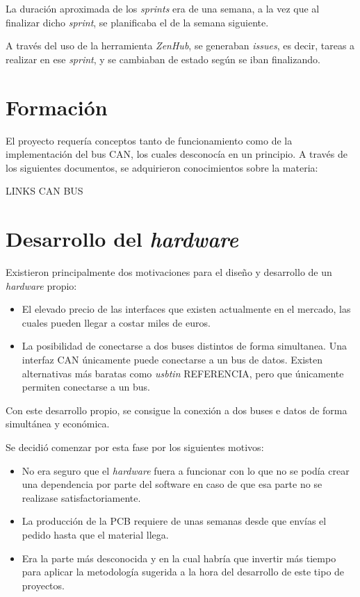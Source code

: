 La duración aproximada de los \emph{sprints} era de una semana, a la vez que al finalizar dicho \emph{sprint}, se planificaba el de la semana siguiente.

A través del uso de la herramienta \emph{ZenHub}, se generaban \emph{issues}, es decir, tareas a realizar en ese \emph{sprint}, y se cambiaban de estado según se iban finalizando.

\section{Formación}\label{formacion}

El proyecto requería conceptos tanto de funcionamiento como de la implementación del bus CAN, los cuales desconocía en un principio. A través de los siguientes documentos, se adquirieron conocimientos sobre la materia:


LINKS CAN BUS


\section{Desarrollo del \emph{hardware}}\label{desarrollo_del_hardware}

Existieron principalmente dos motivaciones para el diseño y desarrollo de un \emph{hardware} propio:

\begin{itemize}
\item
El elevado precio de las interfaces que existen actualmente en el mercado, las cuales pueden llegar a costar miles de euros.
\item
La posibilidad de conectarse a dos buses distintos de forma simultanea. Una interfaz CAN únicamente puede conectarse a un bus de datos. Existen alternativas más baratas como \emph{usbtin} REFERENCIA, pero que únicamente permiten conectarse a un bus.
\end{itemize}

Con este desarrollo propio, se consigue la conexión a dos buses e datos de forma simultánea y económica.

Se decidió comenzar por esta fase por los siguientes motivos:

\begin{itemize}
\item
No era seguro que el \emph{hardware} fuera a funcionar con lo que no se podía crear una dependencia por parte del software en caso de que esa parte no se realizase satisfactoriamente.

\item
La producción de la PCB requiere de unas semanas desde que envías el pedido hasta que el material llega.
\item
Era la parte más desconocida y en la cual habría que invertir más tiempo para aplicar la metodología sugerida a la hora del desarrollo de este tipo de proyectos.
\end{itemize}

